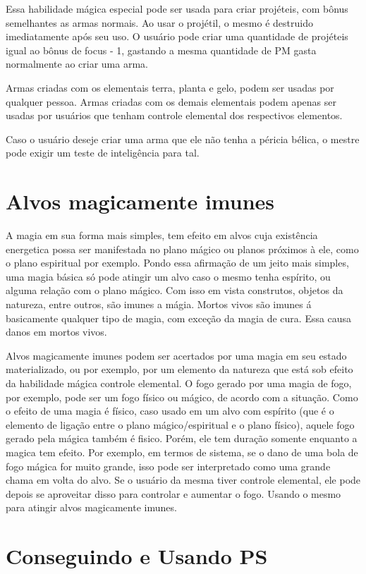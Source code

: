 Essa habilidade mágica especial pode ser usada para criar projéteis, com bônus semelhantes as armas normais. Ao usar o projétil, o mesmo é destruido imediatamente após seu uso. O usuário pode criar uma quantidade de projéteis igual ao bônus de focus - 1, gastando a mesma quantidade de PM gasta normalmente ao criar uma arma.

Armas criadas com os elementais terra, planta e gelo, podem ser usadas por qualquer pessoa. Armas criadas com os demais elementais podem apenas ser usadas por usuários que tenham controle elemental dos respectivos elementos.

Caso o usuário deseje criar uma arma que ele não tenha a péricia bélica, o mestre pode exigir um teste de inteligência para tal.


\section{Alvos magicamente imunes}
A magia em sua forma mais simples, tem efeito em alvos cuja existência energetica possa ser manifestada no plano mágico ou planos próximos à ele, como o plano espiritual por exemplo. Pondo essa afirmação de um jeito mais simples, uma magia básica só pode atingir um alvo caso o mesmo tenha espírito, ou alguma relação com o plano mágico. Com isso em vista construtos, objetos da natureza, entre outros, são imunes a mágia. Mortos vivos são imunes á basicamente qualquer tipo de magia, com exceção da magia de cura. Essa causa danos em mortos vivos.

Alvos magicamente imunes podem ser acertados por uma magia em seu estado materializado, ou por exemplo, por um elemento da natureza que está sob efeito da habilidade mágica controle elemental. O fogo gerado por uma magia de fogo, por exemplo, pode ser um fogo físico ou mágico, de acordo com a situação. Como o efeito de uma magia é físico, caso usado em um alvo com espírito (que é o elemento de ligação entre o plano mágico/espiritual e o plano físico), aquele fogo gerado pela mágica também é fisico. Porém, ele tem duração somente enquanto a magica tem efeito. Por exemplo, em termos de sistema, se o dano de uma bola de fogo mágica for muito grande, isso pode ser interpretado como uma grande chama em volta do alvo. Se o usuário da mesma tiver controle elemental, ele pode depois se aproveitar disso para controlar e aumentar o fogo. Usando o mesmo para atingir alvos magicamente imunes.



\section{Conseguindo e Usando PS}

